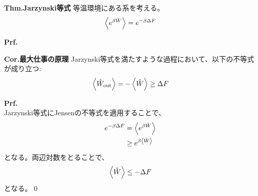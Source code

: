 \documentclass[a4paper,11pt]{jsarticle}
\numberwithin{equation}{section}
\begin{document}
\begin{itembox}[l]{\textbf{Thm.Jarzynski等式}}
  等温環境にある系を考える。%
  \begin{align}
    \ev{e^{\beta \hat{W}}} = e^{-\beta \Delta F}
  \end{align}
\end{itembox}
\textbf{Prf.}\\

\begin{itembox}[l]{\textbf{Cor.最大仕事の原理}}
  Jarzynski等式を満たすような過程において、以下の不等式が成り立つ:
  \begin{align}
    \ev{\hat{W}_{\text{out}}} = -\ev{\hat{W}} \geq \Delta F
  \end{align}
\end{itembox}
\textbf{Prf.}\\
Jarzynski等式にJensenの不等式を適用することで、
\begin{align}
  e^{-\beta \Delta F} &= \ev{e^{\beta \hat{W}}}\\
  &\geq e^{\beta \ev{\hat{W}}}
\end{align}
となる。両辺対数をとることで、
\begin{align}
  \ev{\hat{W}} \leq -\Delta F
\end{align}
となる。\qed
\end{document}
